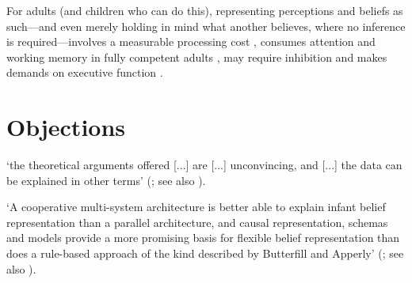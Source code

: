 \documentclass[12pt]{extarticle}
\begin{document}
\begin{multicols*}{3}
\begin{center}
\end{center}

For adults (and children who can do this),
representing perceptions and beliefs as such---and even merely holding in mind
what another believes, where no inference is required---involves a measurable
processing cost \citep{apperly:2008_back,apperly:2010_limits}, consumes attention
and working memory in fully competent adults \citealp{Apperly:2009cc,
lin:2010_reflexively, McKinnon:2007rr},  may require inhibition \citep{bull:2008_role}
and makes demands on executive function \citep{apperly:2004_frontal,samson:2005_seeing}.


\section{Objections}
‘the theoretical arguments offered [...] are [...] unconvincing, and [...]
the data can be explained in other terms’
(\citealp{carruthers:2015_two}; see also \citealp{carruthers:2015_mindreading}).

‘A cooperative multi-system architecture is better able to explain infant belief representation than a
parallel architecture, and causal representation, schemas and models provide a more promising basis
for flexible belief representation than does a rule-based approach of the kind described by Butterfill
and Apperly’ (\citealp{christensen:_twoa}; see also \citealp{michael:2016_flexible,michael:2013_mindreading}).


\footnotesize


\end{multicols*}
\end{document}
